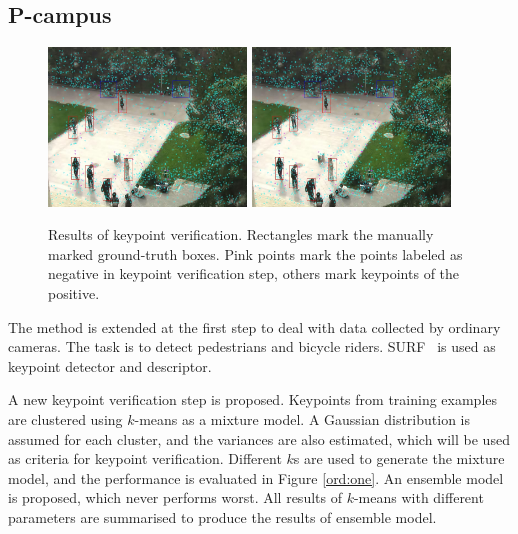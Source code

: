 \subsection{P-campus}





\begin{figure}
{
\includegraphics[width=0.47\textwidth,bb=0 0 720 576]{frame92_af.jpg}
}
{
\includegraphics[width=0.47\textwidth,bb=0 0 720 576]{frame92_af.jpg}
}\\

\caption[Keypoint verification]{Results of keypoint verification. Rectangles mark the manually marked ground-truth boxes. Pink points mark the points labeled as negative in keypoint verification step, others mark keypoints of the positive. }
\label{ord:two}
\end{figure}
The method is extended at the first step to deal with data collected by ordinary cameras. The task is to detect pedestrians and bicycle riders. SURF~\citep{surf} is used as keypoint detector and descriptor.

A new keypoint verification step is proposed. Keypoints from training examples are clustered using $k$-means as a mixture model. A Gaussian distribution is assumed for each cluster, and the variances are also estimated, which will be used as criteria for keypoint verification. Different $k$s are used to generate the mixture model, and the performance is evaluated in Figure \ref{ord:one}.  An ensemble model is proposed, which never performs worst. All results of $k$-means with different parameters are summarised to produce the results of ensemble model.


